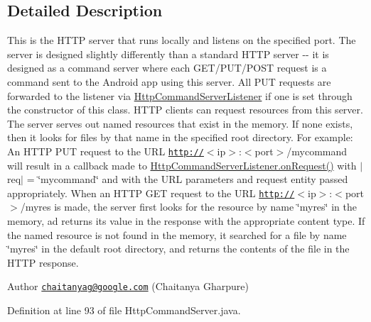 \subsection{Detailed Description}
This is the H\-T\-T\-P server that runs locally and listens on the specified port. The server is designed slightly differently than a standard H\-T\-T\-P server -\/-\/ it is designed as a command server where each G\-E\-T/\-P\-U\-T/\-P\-O\-S\-T request is a command sent to the Android app using this server. All P\-U\-T requests are forwarded to the listener via \hyperlink{interfacecom_1_1cellbots_1_1httpserver_1_1_http_command_server_1_1_http_command_server_listener}{Http\-Command\-Server\-Listener} if one is set through the constructor of this class. H\-T\-T\-P clients can request resources from this server. The server serves out named resources that exist in the memory. If none exists, then it looks for files by that name in the specified root directory. For example\-: An H\-T\-T\-P P\-U\-T request to the U\-R\-L \href{http://}{\tt http\-://}$<$ip$>$\-:$<$port$>$/mycommand will result in a callback made to \hyperlink{interfacecom_1_1cellbots_1_1httpserver_1_1_http_command_server_1_1_http_command_server_listener_a02b6e1dc1f2144f0a56b6a174bde5f0e}{Http\-Command\-Server\-Listener.\-on\-Request()} with $|$req$|$ = \char`\"{}mycommand\char`\"{} and with the U\-R\-L parameters and request entity passed appropriately. When an H\-T\-T\-P G\-E\-T request to the U\-R\-L \href{http://}{\tt http\-://}$<$ip$>$\-:$<$port$>$/myres is made, the server first looks for the resource by name \char`\"{}myres\char`\"{} in the memory, ad returns its value in the response with the appropriate content type. If the named resource is not found in the memory, it searched for a file by name \char`\"{}myres\char`\"{} in the default root directory, and returns the contents of the file in the H\-T\-T\-P response.

\begin{DoxyAuthor}{Author}
\href{mailto:chaitanyag@google.com}{\tt chaitanyag@google.\-com} (Chaitanya Gharpure) 
\end{DoxyAuthor}


Definition at line 93 of file Http\-Command\-Server.\-java.



